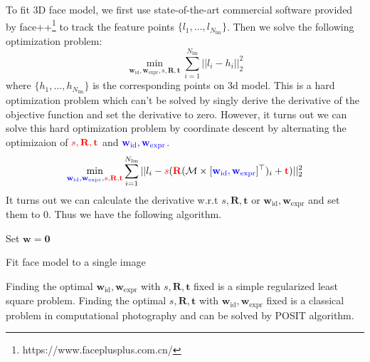 To fit 3D face model, we first use state-of-the-art commercial software provided by face++\footnote{https://www.faceplusplus.com.cn/} to track the feature points $\{l_1, \dots, l_{N_{\text{lm}}}\}$. Then we solve the following optimization problem:
$$\min_{\mathbf{w}_{\text{id}}, \mathbf{w}_{\text{expr}}, s, \mathbf{R}, \mathbf{t}} \sum_{i=1}^{N_{\text{lm}}}||l_i - h_i||_2^2$$
where $\{h_1, \dots, h_{N_{\text{lm}}}\}$ is the corresponding points on 3d model.
This is a hard optimization problem which can't be solved by singly derive the derivative of the objective function and set the derivative to zero. However, it turns out we can solve this hard optimization problem by coordinate descent by alternating the optimizaion of $\color{red}{s, \mathbf{R}, \mathbf{t}}$ and $\color{blue}{\mathbf{w}_{\text{id}}, \mathbf{w}_{\text{expr}}}$.
$$\min_{\color{blue}{\mathbf{w}_{\text{id}}, \mathbf{w}_{\text{expr}}}, \color{red}{s, \mathbf{R}, \mathbf{t}}} \sum_{i=1}^{N_{\text{lm}}}||l_i - \color{red}{s}\color{black}(\color{red}\mathbf{R}\color{black}(\mathcal{M} \times [\color{blue}{\mathbf{w}_{\text{id}}, \mathbf{w}_{\text{expr}}} \color{black}]^\top)_i + \color{red}{\mathbf{t}} \color{black})||_2^2$$
It turns out we can calculate the derivative w.r.t $s, \mathbf{R}, \mathbf{t}$ or $\mathbf{w}_{\text{id}}, \mathbf{w}_{\text{expr}}$ and set them to $0$. Thus we have the following algorithm.


\begin{algorithm}[H]
Set $\mathbf{w} = \mathbf{0}$\;
\caption{Fit face model to a single image}
\end{algorithm}
Finding the optimal $\mathbf{w}_{\text{id}}, \mathbf{w}_{\text{expr}}$ with $s, \mathbf{R}, \mathbf{t}$ fixed is a simple regularized least square problem. Finding the optimal $s, \mathbf{R}, \mathbf{t}$ with $\mathbf{w}_{\text{id}}, \mathbf{w}_{\text{expr}}$ fixed is a classical problem in computational photography and can be solved by POSIT algorithm\cite{dementhon1995model}.



